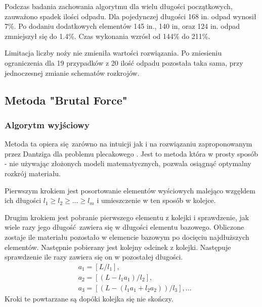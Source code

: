 Podczas badania zachowania algorytmu dla wielu długości początkowych, zauważono spadek ilości odpadu. Dla pojedynczej długości 168 in. odpad wynosił 7\%. Po dodaniu dodatkowych elementów 145 in., 140 in, oraz 124 in. odpad zmniejszył się do 1.4\%. Czas wykonania wzrósł od 144\% do 211\%.

Limitacja liczby noży nie zmieniła wartości rozwiązania. Po zniesieniu ograniczenia dla 19 przypadków z 20 ilość odpadu pozostała taka sama, przy jednoczesnej zmianie schematów rozkrojów.

\subsection{Metoda "Brutal Force"}\label{brutalForce}
\subsubsection{Algorytm wyjściowy}
Metoda ta opiera się zarówno na intuicji jak i na rozwiązaniu zaproponowanym przez Dantziga dla problemu plecakowego \cite{DantzigArticle}. Jest to metoda która w prosty sposób - nie używając złożonych modeli matematycznych, pozwala osiągnąć optymalny rozkrój materiału.

Pierwszym krokiem jest posortowanie elementów wyściowych malejąco wzgęldem ich długości $l_1 \ge l_2 \ge ... \ge l_m$ i umieszczenie w ten sposób w kolejce.

Drugim krokiem jest pobranie pierwszego elementu z kolejki i sprawdzenie, jak wiele razy jego długość zawiera się w długości elementu bazowego. Obliczone zostaje ile materiału pozostało w elemencie bazowym po docięciu najdłuższych elementów. Następnie pobierany jest kolejny odcinek z kolejki. Następuje sprawdzenie ile razy zawiera się on w pozostałej długości.
\begin{equation}\label{base_dantizg}
\begin{split}
& a_1 = [L/l_1],\\
& a_2 = [(L-l_1 a_1)/l_2],\\
& a_3 = [(L-(l_1 a_1+l_2 a_2))/l_3], ...
\end{split}
\end{equation}
Kroki te powtarzane są dopóki kolejka się nie skończy.

